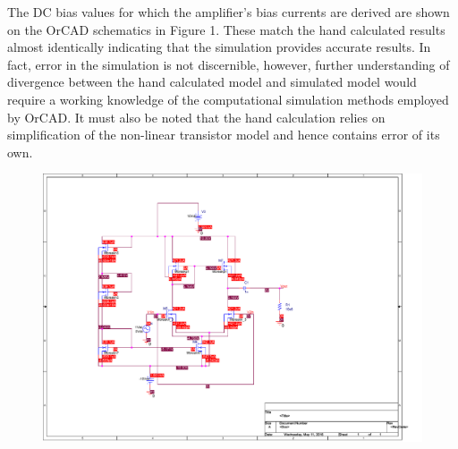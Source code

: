 \documentclass{article}
\begin{document}
The DC bias values for which the amplifier's bias currents are derived are shown on the OrCAD schematics in Figure 1. These match the hand calculated results almost identically indicating that the simulation provides accurate results. In fact, error in the simulation is not discernible, however, further understanding of divergence between the hand calculated model and simulated model would require a working knowledge of the computational simulation methods employed by OrCAD. It must also be noted that the hand calculation relies on simplification of the non-linear transistor model and hence contains error of its own.\\

\begin{figure}[H]
	\hspace{-3em}\includegraphics[scale=0.5]{pic2.pdf}
\end{figure}

\newpage
\end{document}
